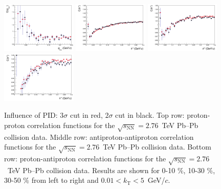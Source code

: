 \begin{figure}
  \includegraphics[width=0.32\textwidth]{cmp_dcatpconly11h_pid_3sig_2sig_cen4/APAP}
  \includegraphics[width=0.32\textwidth]{cmp_dcatpconly11h_pid_3sig_2sig_cen0/PAP}
  \includegraphics[width=0.32\textwidth]{cmp_dcatpconly11h_pid_3sig_2sig_cen2/PAP}
  \includegraphics[width=0.32\textwidth]{cmp_dcatpconly11h_pid_3sig_2sig_cen4/PAP}
  \caption{{Influence of PID: $3\sigma$ cut in red, $2\sigma$ cut in black}. Top row: proton-proton correlation functions for the $\sqrt{s_{\mathrm{NN}}}=2.76$~TeV Pb--Pb collision data. Middle row: antiproton-antiproton correlation functions for the $\sqrt{s_{\mathrm{NN}}}=2.76$~TeV Pb--Pb collision data. Bottom row: proton-antiproton correlation functions for the $\sqrt{s_{\mathrm{NN}}}=2.76$~TeV Pb--Pb collision data. Results are shown for 0-10 $\%$, 10-30 $\%$,  30-50 $\%$ from left to right and $0.01 < k_{\mathrm{T}}<5$~GeV/$c$.}
  \label{cf_3sig_2sig}
\end{figure}


